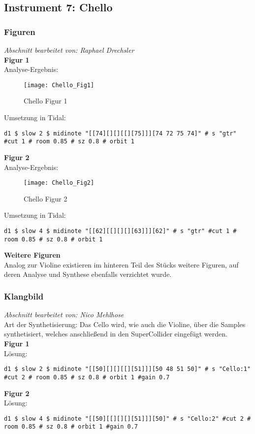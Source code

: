 \documentclass[
10pt, %
a4paper, %
oneside, %
headinclude,footinclude, %
BCOR5mm, %
]{scrartcl}
\begin{document}
\subsection{Instrument 7: Chello}
\subsubsection{Figuren}
\textit{Abschnitt bearbeitet von: Raphael Drechsler}\\

\noindent\textbf{Figur 1}\\
Analyse-Ergebnis:
\begin{figure}[h]
	\centering 
	\texttt{[image: Chello\_Fig1]} 
	\caption{Chello Figur 1}
\end{figure}

\noindent Umsetzung in Tidal:
\begin{lstlisting}
d1 $ slow 2 $ midinote "[[74][][][[][75]]][74 72 75 74]" # s "gtr" #cut 1 # room 0.85 # sz 0.8 # orbit 1
\end{lstlisting}

\noindent\textbf{Figur 2}\\
Analyse-Ergebnis:
\begin{figure}[h]
	\centering 
	\texttt{[image: Chello\_Fig2]} 
	\caption{Chello Figur 2}
\end{figure}

\noindent Umsetzung in Tidal:
\begin{lstlisting}
d1 $ slow 4 $ midinote "[[62][[][][][63]]][62]" # s "gtr" #cut 1 # room 0.85 # sz 0.8 # orbit 1
\end{lstlisting}

\noindent\textbf{Weitere Figuren}\\
Analog zur Violine existieren im hinteren Teil des Stücks weitere Figuren, auf deren Analyse und Synthese ebenfalls verzichtet wurde.

\subsubsection{Klangbild}
\textit{Abschnitt bearbeitet von: Nico Mehlhose}\\

\noindent 
Art der Synthetisierung: Das Cello wird, wie auch die Violine, über die Samples synthetisiert\cite{Orch}, welches anschließend in den SuperCollider eingefügt werden.\\

\noindent\textbf{Figur 1}\\
Lösung:
\begin{lstlisting}
d1 $ slow 2 $ midinote "[[50][][][[][51]]][50 48 51 50]" # s "Cello:1" #cut 2 # room 0.85 # sz 0.8 # orbit 1 #gain 0.7
\end{lstlisting}
\noindent\textbf{Figur 2}\\
Lösung:
\begin{lstlisting}
d1 $ slow 4 $ midinote "[[50][[][][][51]]][50]" # s "Cello:2" #cut 2 # room 0.85 # sz 0.8 # orbit 1 #gain 0.7
\end{lstlisting}
\end{document}
